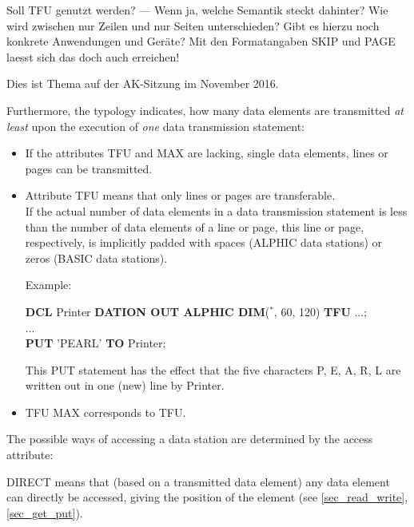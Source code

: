 \begin{discuss}
Soll  TFU genutzt werden? --- Wenn ja, welche Semantik steckt dahinter?
Wie wird zwischen nur Zeilen und nur Seiten unterschieden?
Gibt es hierzu noch konkrete Anwendungen und Geräte?
Mit den Formatangaben SKIP und PAGE laesst sich das doch auch erreichen!

Dies ist Thema auf der AK-Sitzung im November 2016.



Furthermore, the typology indicates, how many data elements are
transmitted {\em at least} upon the execution of {\em one} data
transmission statement:
\begin{itemize}
\item If the attributes TFU and MAX are lacking, single data elements,
lines or pages can be transmitted.
\item Attribute TFU means that only lines or pages are transferable.\\
If the actual number of data elements in a data transmission statement
is less than the number of data elements of a line or page, this line or
page, respectively, is implicitly padded with spaces (ALPHIC data
stations) or zeros (BASIC data stations).

Example:

{\bf DCL} Printer {\bf DATION OUT ALPHIC DIM}($^*$, 60, 120) {\bf TFU} ...;\\
... \\
{\bf PUT} 'PEARL' {\bf TO} Printer;

This PUT statement has the effect that the five characters P, E, A, R,
L are written out in one (new) line by Printer.
\item TFU MAX corresponds to TFU.
\end{itemize}
\end{discuss}

The possible ways of accessing a data station are determined by the
access attribute:



DIRECT 
means that (based on a transmitted data element) any data element
can directly be accessed, giving the position of the element
(see \ref{sec_read_write}, \ref{sec_get_put}).

